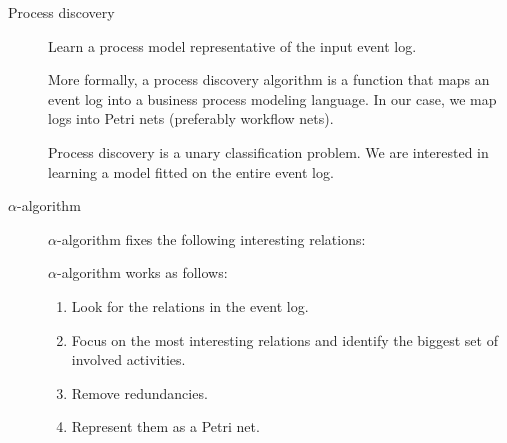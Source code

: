 \begin{description}
    \item[Process discovery] 
        Learn a process model representative of the input event log.

        More formally, a process discovery algorithm is a function that maps an event log into a business process modeling language.
        In our case, we map logs into Petri nets (preferably workflow nets).

        \begin{remark}
            Process discovery is a unary classification problem.
            We are interested in learning a model fitted on the entire event log.
        \end{remark}

    \item[$\alpha$-algorithm] 
        $\alpha$-algorithm fixes the following interesting relations:

        $\alpha$-algorithm works as follows:
        \begin{enumerate}
            \item Look for the relations in the event log.
            \item Focus on the most interesting relations and identify the biggest set of involved activities.
            \item Remove redundancies.
            \item Represent them as a Petri net.
        \end{enumerate}


\end{description}
